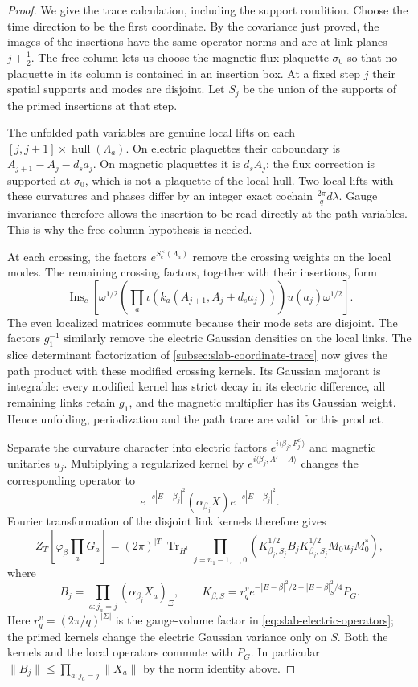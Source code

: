 \begin{proof}
We give the trace calculation, including the support condition.
Choose the time direction to be the first coordinate. By the
covariance just proved, the images of the insertions have the same
operator norms and are at link planes $j+\tfrac12$. The free column
lets us choose the magnetic flux plaquette $\sigma_0$ so that no
plaquette in its column is contained in an insertion box.
At a fixed step $j$ their spatial supports and modes
are disjoint. Let $S_j$ be the union of the supports of the primed
insertions at that step.

The unfolded path variables are genuine local lifts on each
$[j,j+1]\times\operatorname{hull}(\Lambda_a)$. On electric
plaquettes their coboundary is $A_{j+1}-A_j-d_sa_j$. On magnetic
plaquettes it is $d_sA_j$; the flux correction is supported at
$\sigma_0$, which is not a plaquette of the local hull.
Two local lifts with
these curvatures and phases differ by an integer exact cochain
$\frac{2\pi}{q}d\lambda$. Gauge invariance therefore allows the
insertion to be read directly at the path variables. This is why
the free-column hypothesis is needed.

At each crossing, the factors $e^{S_c^\times(\Lambda_a)}$ remove
the crossing weights on the local modes. The remaining crossing
factors, together with their insertions, form
\[
 \operatorname{Ins}_c\left[
   \omega^{1/2}\left(\prod_a\iota(k_a(A_{j+1},A_j+d_sa_j))\right)
                   u(a_j)\omega^{1/2}\right].
\]
The even localized matrices commute because their mode sets are
disjoint. The factors $g_1^{-1}$ similarly remove the electric
Gaussian densities on the local links. The slice determinant
factorization of \cref{subsec:slab-coordinate-trace} now gives
the path product with these modified crossing kernels. Its
Gaussian majorant is integrable: every modified kernel has
strict decay in its electric difference, all remaining links
retain $g_1$, and the magnetic multiplier has its Gaussian
weight. Hence unfolding, periodization and the path trace are
valid for this product.

Separate the curvature character into electric factors
$e^{i\langle\beta_j,F_j^{\mathrm{el}}\rangle}$ and magnetic
unitaries $u_j$. Multiplying a regularized kernel by
$e^{i\langle\beta_j,A'-A\rangle}$ changes the corresponding
operator to
\[
 e^{-s|E-\beta_j|^2}(\alpha_{\beta_j}X)e^{-s|E-\beta_j|^2}.
\]
Fourier transformation of the disjoint link kernels therefore
gives
\begin{equation}\label{eq:diag-mixed-trace}
 Z_T\left[\varphi_\beta\prod_aG_a\right]
 =(2\pi)^{|T|}\operatorname{Tr}_{H^l}
  \prod_{j=n_1-1,\ldots,0}
  \left(K_{\beta_j,S_j}^{1/2}B_jK_{\beta_j,S_j}^{1/2}
                         M_0u_jM_0^*\right),
\end{equation}
where
\[
 B_j=\prod_{a:j_a=j}(\alpha_{\beta_j}X_a)_\Xi,\qquad
 K_{\beta,S}=r_q^v
     e^{-|E-\beta|^2/2+|E-\beta|_S^2/4}P_G.
\]
Here $r_q^v=(2\pi/q)^{|\Sigma|}$ is the gauge-volume factor in
\eqref{eq:slab-electric-operators}; the primed kernels change
the electric Gaussian variance only on $S$. Both the kernels and the local operators
commute with $P_G$. In particular
$\|B_j\|\le\prod_{a:j_a=j}\|X_a\|$ by the norm identity above.


\end{proof}

